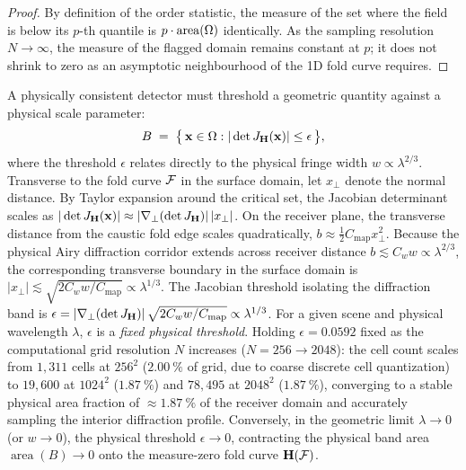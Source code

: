 \begin{proof}
By definition of the order statistic, the measure of the set where the field is below
its $p$-th quantile is $p \cdot \operatorname{area}(\Omega)$ identically.
As the sampling resolution $N \to \infty$, the measure of the flagged domain remains
constant at $p$; it does not shrink to zero as an asymptotic neighbourhood
of the 1D fold curve requires.
\end{proof}

A physically consistent detector must threshold a geometric quantity
against a physical scale parameter:
\begin{equation}
B \;=\; \big\{\,\mathbf{x} \in \Omega : |\det J_{\mathbf{H}}(\mathbf{x})| \le \epsilon\,\big\},
\label{eq:physicaldetector}
\end{equation}
where the threshold $\epsilon$ relates directly to the physical fringe width $w \propto \lambda^{2/3}$.
Transverse to the fold curve $\mathcal{F}$ in the surface domain, let $x_{\perp}$ denote the
normal distance. By Taylor expansion around the critical set, the Jacobian determinant
scales as $|\det J_{\mathbf{H}}(\mathbf{x})| \approx |\nabla_{\perp}(\det J_{\mathbf{H}})|\,|x_{\perp}|$.
On the receiver plane, the transverse distance from the caustic fold edge scales quadratically,
$b \approx \frac{1}{2} C_{\text{map}} x_{\perp}^2$. Because the physical Airy diffraction corridor
extends across receiver distance $b \lesssim C_w w \propto \lambda^{2/3}$, the corresponding
transverse boundary in the surface domain is $|x_{\perp}| \lesssim \sqrt{2 C_w w / C_{\text{map}}} \propto \lambda^{1/3}$.
The Jacobian threshold isolating the diffraction band is
$\epsilon = |\nabla_{\perp}(\det J_{\mathbf{H}})|\,\sqrt{2 C_w w / C_{\text{map}}} \propto \lambda^{1/3}$.
For a given scene and physical wavelength $\lambda$, $\epsilon$ is a \emph{fixed physical threshold}.
Holding $\epsilon = 0.0592$ fixed as the computational grid resolution $N$ increases ($N = 256 \to 2048$):
the cell count scales from $1{,}311$ cells at $256^2$ ($\SI{2.00}{\percent}$ of grid, due to coarse discrete cell quantization)
to $19{,}600$ at $1024^2$ ($\SI{1.87}{\percent}$) and $78{,}495$ at $2048^2$ ($\SI{1.87}{\percent}$),
converging to a stable physical area fraction of $\approx \SI{1.87}{\percent}$ of the receiver domain
and accurately sampling the interior diffraction profile.
Conversely, in the geometric limit $\lambda \to 0$ (or $w \to 0$), the physical threshold $\epsilon \to 0$,
contracting the physical band area $\operatorname{area}(B) \to 0$ onto the measure-zero fold curve $\mathbf{H}(\mathcal{F})$.

